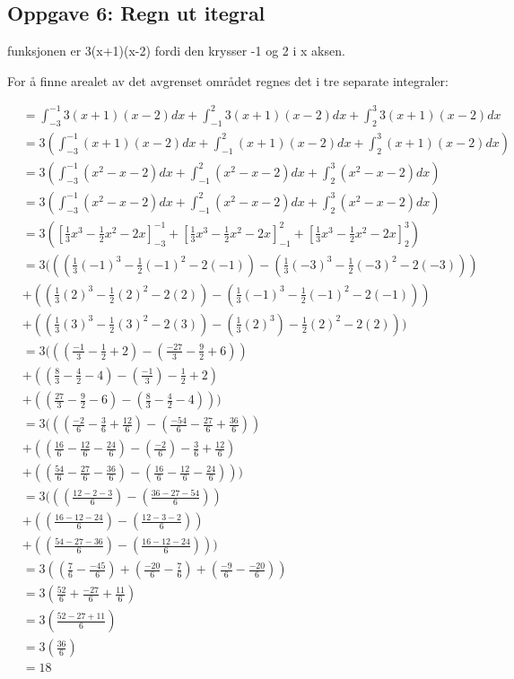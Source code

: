 \documentclass{article}
\begin{document}
\subsection{Oppgave 6: Regn ut itegral}

funksjonen er 3(x+1)(x-2) fordi den krysser -1 og 2 i x aksen.

For å finne arealet av det avgrenset området regnes det i tre separate integraler:

\begin{align*}
    &= \int_{-3}^{-1}3(x+1)(x-2)dx  + \int_{-1}^{2}3(x+1)(x-2)dx + \int_{2}^{3}3(x+1)(x-2)dx \\
    &= 3 (\int_{-3}^{-1}(x+1)(x-2)dx  + \int_{-1}^{2}(x+1)(x-2)dx + \int_{2}^{3}(x+1)(x-2)dx) \\
    &= 3 (\int_{-3}^{-1}(x^2-x-2) dx  + \int_{-1}^{2}(x^2-x-2) dx + \int_{2}^{3}(x^2-x-2) dx) \\
    &= 3 (\int_{-3}^{-1}(x^2-x-2) dx  + \int_{-1}^{2}(x^2-x-2) dx + \int_{2}^{3}(x^2-x-2) dx) \\
    &= 3 ([\frac{1}{3}x^3 - \frac{1}{2} x^2 - 2x]^{-1}_{-3} + [\frac{1}{3}x^3 - \frac{1}{2} x^2 - 2x]^2_{-1} + [\frac{1}{3}x^3 - \frac{1}{2} x^2 - 2x]^3_2) \\
    &= 3 (((\frac{1}{3}(-1)^3 - \frac{1}{2} (-1)^2 - 2(-1)) - (\frac{1}{3}(-3)^3 - \frac{1}{2} (-3)^2 - 2(-3))) \\
    &+ ((\frac{1}{3}(2)^3 - \frac{1}{2} (2)^2 - 2(2)) - (\frac{1}{3}(-1)^3 - \frac{1}{2} (-1)^2 - 2(-1))) \\
    &+ ((\frac{1}{3}(3)^3 - \frac{1}{2} (3)^2 - 2(3)) - (\frac{1}{3}(2)^3) - \frac{1}{2} (2)^2 - 2(2))) \\
    &= 3 (((\frac{-1}{3}-\frac{1}{2}+2) - (\frac{-27}{3}-\frac{9}{2}+6)) \\
    &+ ((\frac{8}{3}-\frac{4}{2}-4) - (\frac{-1}{3})-\frac{1}{2}+2) \\
    &+ ((\frac{27}{3} - \frac{9}{2} - 6) - (\frac{8}{3}-\frac{4}{2}-4))) \\
    &= 3 (((\frac{-2}{6}-\frac{3}{6}+\frac{12}{6}) - (\frac{-54}{6}-\frac{27}{6}+\frac{36}{6})) \\
    &+ ((\frac{16}{6}-\frac{12}{6}-\frac{24}{6}) - (\frac{-2}{6})-\frac{3}{6}+\frac{12}{6}) \\
    &+ ((\frac{54}{6} - \frac{27}{6} - \frac{36}{6}) - (\frac{16}{6}-\frac{12}{6}-\frac{24}{6}))) \\
    &= 3 (((\frac{12-2-3}{6}) - (\frac{36-27-54}{6})) \\
    &+ ((\frac{16-12-24}{6}) - (\frac{12-3-2}{6})) \\
    &+ ((\frac{54-27-36}{6}) - (\frac{16-12-24}{6}))) \\
    &= 3 ((\frac{7}{6} - \frac{-45}{6}) + (\frac{-20}{6} - \frac{7}{6}) + (\frac{-9}{6} - \frac{-20}{6})) \\ 
    &= 3 (\frac{52}{6} + \frac{-27}{6} + \frac{11}{6}) \\
    &= 3 (\frac{52-27+11}{6}) \\
    &= 3 (\frac{36}{6}) \\
    &= 18
\end{align*}
\end{document}
